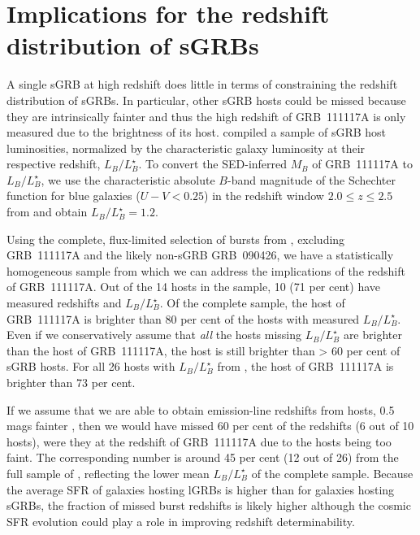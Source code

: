\documentclass{aa}    %
\begin{document}


\section{Implications for the redshift distribution of sGRBs}


A single sGRB at high redshift does little in terms of constraining the redshift
distribution of sGRBs. In particular, other sGRB hosts could be missed because
they are intrinsically fainter and thus the high redshift of GRB~111117A is only
measured due to the brightness of its host. \citet{Berger2014} compiled a
sample of sGRB host luminosities, normalized by the characteristic galaxy
luminosity at their respective redshift, $L_B/L^{\star}_{B}$. To convert the
SED-inferred $M_B$ of GRB~111117A to $L_B/L^{\star}_{B}$, we use the
characteristic absolute $B$-band magnitude of the Schechter function for blue
galaxies ($U - V < 0.25$) in the redshift window $2.0 \leq z \leq 2.5$ from
\citet{Marchesini2007} and obtain $L_B/L^{\star}_{B} = 1.2$.

Using the complete, flux-limited selection of bursts from \citet{DAvanzo2014a},
excluding GRB~111117A and the likely non-sGRB GRB~090426, we have a
statistically homogeneous sample from which we can address the implications of
the redshift of GRB~111117A. Out of the 14 hosts in the sample, 10 (71 per cent)
have measured redshifts and $L_B/L^{\star}_{B}$. Of the complete sample, the
host of GRB~111117A  is brighter than 80 per cent of the hosts with measured
$L_B/L^{\star}_{B}$. Even if we conservatively assume that \textit{all} the
hosts missing $L_B/L^{\star}_{B}$ are brighter than the host of GRB~111117A, the
host is still brighter than > 60 per cent of sGRB hosts. For all 26 hosts with
$L_B/L^{\star}_{B}$ from \citet{Berger2014}, the host of GRB~111117A is brighter
than 73 per cent.

If we assume that we are able to obtain emission-line redshifts from hosts, 0.5
mags fainter \citep[$R < 24.5$~mag;][]{Kruhler2012}, then we would have missed 60
per cent of the redshifts (6 out of 10 hosts), were they at the redshift of
GRB~111117A due to the hosts being too faint. The corresponding number is around
45 per cent (12 out of 26) from the full sample of \citet{Berger2014},
reflecting the lower mean $L_B/L^{\star}_{B}$ of the complete sample. Because
the average SFR of galaxies hosting lGRBs is higher than for galaxies hosting
sGRBs, the fraction of missed burst redshifts is likely higher although the
cosmic SFR evolution could play a role in improving redshift determinability.
\end{document}
